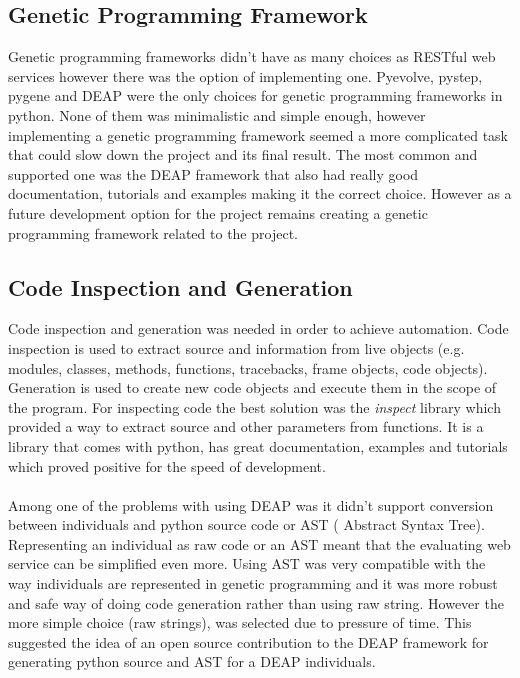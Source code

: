 \subsection{Genetic Programming Framework}
Genetic programming frameworks didn't have as many choices as RESTful web services however there was the option of implementing one.  Pyevolve\cite{pyevolve}, pystep\cite{pystep}, pygene\cite{pygene} and DEAP\cite{deap} were 
the only choices for genetic programming frameworks in python. None of them was minimalistic and simple enough, however implementing a genetic programming framework seemed a more complicated task
that could slow down the project and its final result. The most common and supported one was
the DEAP framework that also had really good documentation, tutorials and examples making it the correct choice. However as a future development option for the project
remains creating a genetic programming framework related to the project.
\subsection{Code Inspection and Generation}
Code inspection and generation was needed in order to achieve automation. Code inspection is used to extract source and information from live objects (e.g. modules, classes, methods, functions, tracebacks, 
frame objects, code objects). Generation is used to create new code objects and execute them in the scope of the program.
For inspecting code the best solution was the \textit{inspect} library which provided a way to extract source and other parameters from functions. It is a library that comes with python, 
has great documentation, examples and tutorials which proved positive for the speed of development.
\paragraph{}
Among one of the problems with using DEAP was it didn't support conversion between individuals and python source code or AST ( Abstract Syntax Tree). Representing an individual as raw code or an AST meant that 
the evaluating web service can be simplified even more. Using AST was very compatible with the way individuals are represented in genetic programming and it was more
robust and safe way of doing code generation rather than using raw string. However the more simple choice (raw strings), was selected due to pressure of time.  This suggested the idea of an open source contribution to the DEAP framework
 for generating python source 
and AST for a DEAP individuals.
